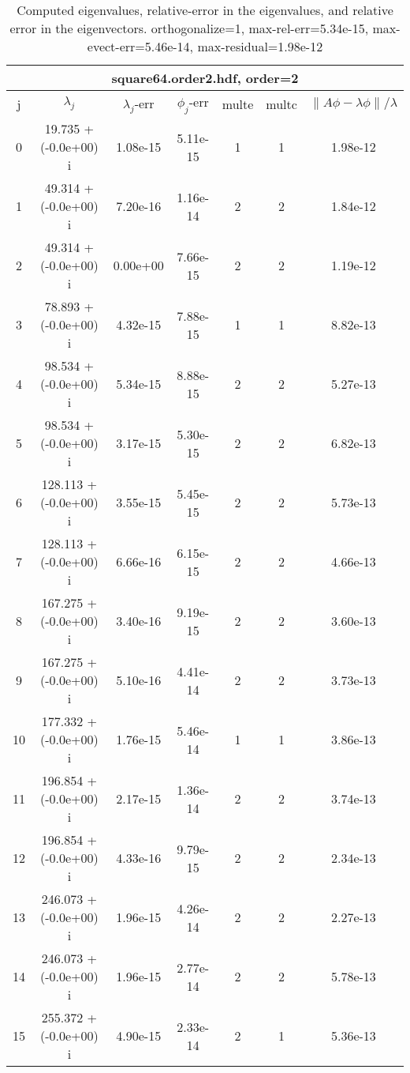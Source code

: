 \begin{table}[H]\tableFont %
\begin{center}
\begin{tabular}{|c|c|c|c|c|c|c|}  \hline
\multicolumn{7}{|c|}{square64.order2.hdf, order=2} \\ \hline
   j    &         $\lambda_j$        & $\lambda_j$-err  & $\phi_j$-err  & multe & multc & $\| A\phi - \lambda\phi\|/\lambda$     \\ \hline
     0  &     19.735 + (-0.0e+00) i  &    1.08e-15      &   5.11e-15    &   1    &  1   &    1.98e-12 \\
     1  &     49.314 + (-0.0e+00) i  &    7.20e-16      &   1.16e-14    &   2    &  2   &    1.84e-12 \\
     2  &     49.314 + (-0.0e+00) i  &    0.00e+00      &   7.66e-15    &   2    &  2   &    1.19e-12 \\
     3  &     78.893 + (-0.0e+00) i  &    4.32e-15      &   7.88e-15    &   1    &  1   &    8.82e-13 \\
     4  &     98.534 + (-0.0e+00) i  &    5.34e-15      &   8.88e-15    &   2    &  2   &    5.27e-13 \\
     5  &     98.534 + (-0.0e+00) i  &    3.17e-15      &   5.30e-15    &   2    &  2   &    6.82e-13 \\
     6  &    128.113 + (-0.0e+00) i  &    3.55e-15      &   5.45e-15    &   2    &  2   &    5.73e-13 \\
     7  &    128.113 + (-0.0e+00) i  &    6.66e-16      &   6.15e-15    &   2    &  2   &    4.66e-13 \\
     8  &    167.275 + (-0.0e+00) i  &    3.40e-16      &   9.19e-15    &   2    &  2   &    3.60e-13 \\
     9  &    167.275 + (-0.0e+00) i  &    5.10e-16      &   4.41e-14    &   2    &  2   &    3.73e-13 \\
    10  &    177.332 + (-0.0e+00) i  &    1.76e-15      &   5.46e-14    &   1    &  1   &    3.86e-13 \\
    11  &    196.854 + (-0.0e+00) i  &    2.17e-15      &   1.36e-14    &   2    &  2   &    3.74e-13 \\
    12  &    196.854 + (-0.0e+00) i  &    4.33e-16      &   9.79e-15    &   2    &  2   &    2.34e-13 \\
    13  &    246.073 + (-0.0e+00) i  &    1.96e-15      &   4.26e-14    &   2    &  2   &    2.27e-13 \\
    14  &    246.073 + (-0.0e+00) i  &    1.96e-15      &   2.77e-14    &   2    &  2   &    5.78e-13 \\
    15  &    255.372 + (-0.0e+00) i  &    4.90e-15      &   2.33e-14    &   2    &  1   &    5.36e-13 \\
\hline
\end{tabular}
\caption{Computed eigenvalues, relative-error in the eigenvalues, and relative error in the eigenvectors. orthogonalize=1, max-rel-err=5.34e-15, max-evect-err=5.46e-14, max-residual=1.98e-12
}\label{table:genEigssquare64.order2.hdf}
\end{center}
\end{table}
